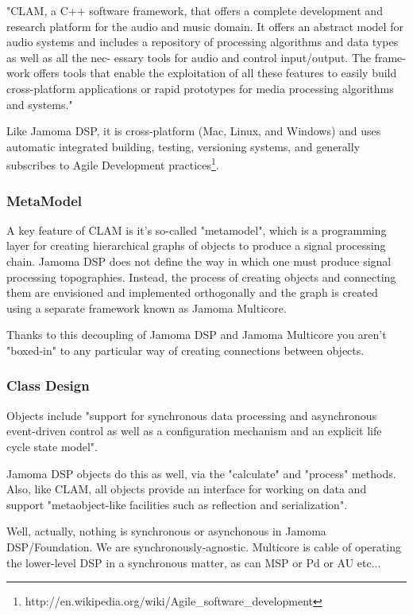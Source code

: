 \documentclass[twoside,10pt]{article}
\begin{document}
"CLAM, a C++ software framework, that offers a complete development and research platform for the audio and music domain. It offers an abstract model for audio systems and includes a repository of processing algorithms and data types as well as all the nec- essary tools for audio and control input/output. The frame- work offers tools that enable the exploitation of all these features to easily build cross-platform applications or rapid prototypes for media processing algorithms and systems." \cite{Amatraian:2008}

Like Jamoma DSP, it is cross-platform (Mac, Linux, and Windows) and uses automatic integrated building, testing, versioning systems, and generally subscribes to Agile Development practices\footnote{http://en.wikipedia.org/wiki/Agile_software_development}.  

\subsubsection{MetaModel}

A key feature of CLAM is it's so-called "metamodel", which is a programming layer for creating hierarchical graphs of objects to produce a signal processing chain.  Jamoma DSP does not define the way in which one must produce signal processing topographies.  Instead, the process of creating objects and connecting them are envisioned and implemented orthogonally and the graph is created using a separate framework known as Jamoma Multicore.

Thanks to this decoupling of Jamoma DSP and Jamoma Multicore you aren't "boxed-in" to any particular way of creating connections between objects.

\subsubsection{Class Design}

Objects include "support for synchronous data processing and asynchronous event-driven control as well as a configuration mechanism and an explicit life cycle state model". 

Jamoma DSP objects do this as well, via the "calculate" and "process" methods.  Also, like CLAM, all objects provide an interface for working on data and support "metaobject-like facilities such as reflection and serialization".

Well, actually, nothing is synchronous or asynchonous in Jamoma DSP/Foundation.  We are synchronously-agnostic.  Multicore is cable of operating the lower-level DSP in a synchronous matter, as can MSP or Pd or AU etc...
\end{document}

